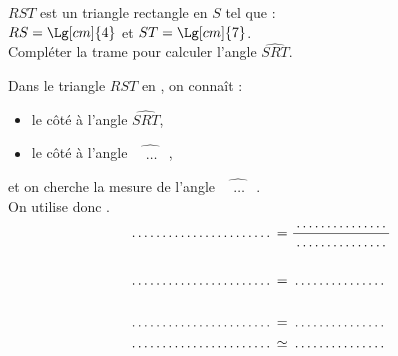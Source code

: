 \begin{exercice*}
    $RST$ est un triangle rectangle en $S$ tel que :\\$RS=\Lg[cm]{4}$ et $ST=\Lg[cm]{7}$.\\
    Compléter la trame pour calculer l'angle $\widehat{SRT}$.
    \begin{center}
    \end{center}
    Dans le triangle $RST$ \makebox[0.4\linewidth]{\dotfill} en \makebox[0.1\linewidth]{\dotfill}, on connaît :
    \begin{itemize}        
        \item le côté \makebox[0.3\linewidth]{\dotfill} à l'angle $\widehat{SRT}$,
        \item le côté \makebox[0.3\linewidth]{\dotfill} à l'angle $\widehat{\phantom{M}\dots\phantom{N}}$,
    \end{itemize}
    et on cherche la mesure de l'angle $\widehat{\phantom{M}\dots\phantom{N}}$.\\ On utilise donc \makebox[0.2\linewidth]{\dotfill}.
    \begin{align*}
        \makebox[0.3\linewidth]{\dotfill}&=\frac{\makebox[0.2\linewidth]{\dotfill}}{\makebox[0.2\linewidth]{\dotfill}}\\
        &\\
        \makebox[0.3\linewidth]{\dotfill}&=\makebox[0.2\linewidth]{\dotfill}\\
        &\\        
        \makebox[0.3\linewidth]{\dotfill}&=\makebox[0.2\linewidth]{\dotfill}\\        
        \makebox[0.3\linewidth]{\dotfill}&\simeq\makebox[0.2\linewidth]{\dotfill}
    \end{align*}
\end{exercice*}
